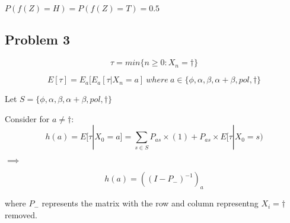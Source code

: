 \documentclass{article}
\begin{document}
$P(f(Z)=H) = P(f(Z)=T)=0.5$

    \subsection{Problem 3}\label{problem-3}

\[
\tau = min\{ n \geq 0: X_n=\dagger\}
\]

\[
E[\tau] = E_a[E_a[\tau|X_n=a]\ where\ a \in \{\phi, \alpha, \beta, \alpha+\beta, pol, \dagger\}
\]

Let $S=\{\phi, \alpha, \beta, \alpha+\beta, pol, \dagger\}$

Consider for $a\neq \dagger$: \[
h(a) = E[\tau|X_0=a] = \sum_{s \in S}P_{as} \times (1) + P_{as}\times E[\tau|X_0=s) 
\]

$\implies$

\[
h(a) = ((I-P_{-})^{-1})_a
\]

where $P_{-}$ represents the matrix with the row and column representng
$X_i=\dagger$ removed.
\end{document}
